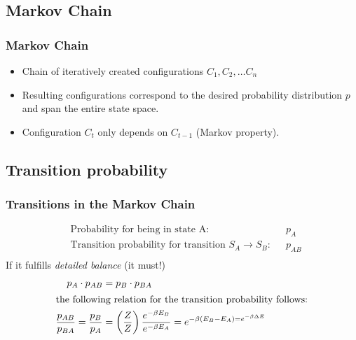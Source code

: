 \documentclass{beamer}
\begin{document}
\subsection{Markov Chain}
\begin{frame}
\frametitle{Markov Chain}
\begin{itemize}
\item Chain of iteratively created configurations $C_1, C_2, \ldots C_n$
\item Resulting configurations correspond to the desired probability distribution $p$ and span the entire state space.
\item Configuration $C_t$ only depends on $C_{t-1}$ (Markov property).
\end{itemize}
\end{frame}

\subsection{Transition probability}
\begin{frame}
\frametitle{Transitions in the Markov Chain}
\begin{align*}
&\text{Probability for being in state A: }	&& p_A\\
&\text{Transition probability for transition $S_A \rightarrow S_B$:} &&p_{AB}\\
\end{align*}
If it fulfills \textit{detailed balance} (it must!)
\begin{align*}
 p_A\cdot p_{AB} &= p_B\cdot p_{BA}\\
\intertext{the following relation for the transition probability follows:}
\frac{p_{AB}}{p_{BA}} = \frac{p_B}{p_A} &= \left(\frac{Z}{Z}\right)\frac{e^{-\beta E_B}}{e^{-\beta E_A}}  = e^{-\beta (E_B - E_A) = e^{-\beta \Delta E}}
\end{align*}
\end{frame}
\end{document}
